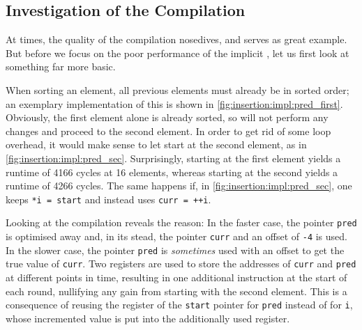 \subsection*{Investigation of the Compilation}
\label{sec:tasklet:insertion:compilation}

At times, the quality of the compilation nosedives, and \IS{} serves as great example.
But before we focus on the poor performance of the implicit \IS{}, let us first look at something far more basic.

When sorting an element, all previous elements must already be in sorted order;
an exemplary implementation of this is shown in \cref{fig:insertion:impl:pred_first}.
Obviously, the first element alone is already sorted, so \IS{} will not perform any changes and proceed to the second element.
In order to get rid of some loop overhead, it would make sense to let \IS{} start at the second element, as in \cref{fig:insertion:impl:pred_sec}.
Surprisingly, starting at the first element yields a runtime of 4166 cycles at 16 elements, whereas starting at the second yields a runtime of 4266 cycles.
The same happens if, in \cref{fig:insertion:impl:pred_sec}, one keeps \lstinline|*i = start| and instead uses \lstinline|curr = ++i|.

Looking at the compilation reveals the reason:
In the faster case, the pointer \lstinline|pred| is optimised away and, in its stead, the pointer \lstinline|curr| and an offset of \lstinline|-4| is used.
In the slower case, the pointer \lstinline|pred| is \emph{sometimes} used with an offset to get the true value of \lstinline|curr|.
Two registers are used to store the addresses of \lstinline|curr| and \lstinline|pred| at different points in time, resulting in one additional instruction at the start of each round, nullifying any gain from starting with the second element.
This is a consequence of reusing the register of the \lstinline|start| pointer for \lstinline|pred| instead of for \lstinline|i|, whose incremented value is put into the additionally used register.

